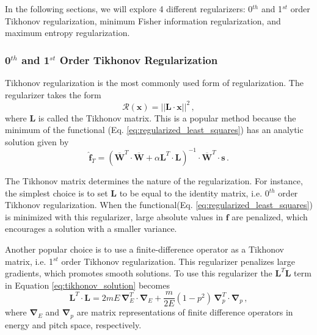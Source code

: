 In the following sections, we will explore 4 different regularizers: 0$^{th}$ and 1$^{st}$ order Tikhonov regularization, minimum Fisher information regularization, and maximum entropy regularization.

\subsubsection{0$^{th}$ and 1$^{st}$ Order Tikhonov Regularization}
Tikhonov regularization is the most commonly used form of regularization. The regularizer takes the form
\begin{equation}
    \mathcal{R}(\mathbf{x}) = ||\mathbf{L}\cdot\mathbf{x}||^2 \,,
\end{equation}
where $\mathbf{L}$ is called the Tikhonov matrix. This is a popular method because the minimum of the functional (Eq. \ref{eq:regularized_least_squares}) has an analytic solution given by
\begin{equation}\label{eq:tikhonov_solution}
    \mathbf{\hat{f}}_T = \left(\mathbf{\overline{W}}^T \cdot \mathbf{\overline{W}} + \alpha \mathbf{L}^T\cdot \mathbf{L} \right)^{-1} \cdot \mathbf{\overline{W}}^T \cdot \mathbf{s} \, . 
\end{equation}

The Tikhonov matrix determines the nature of the regularization. 
For instance, the simplest choice is to set $\mathbf{L}$ to be equal to the identity matrix, i.e. 0$^{th}$ order Tikhonov regularization. When the functional(Eq. \ref{eq:regularized_least_squares}) is minimized with this regularizer, large absolute values in $\mathbf{f}$ are penalized, which encourages a solution with a smaller variance.

Another popular choice is to use a finite-difference operator as a Tikhonov matrix, i.e. 1$^{st}$ order Tikhonov regularization. This regularizer penalizes large gradients, which promotes smooth solutions.
To use this regularizer the $\mathbf{L}^T \mathbf{L}$ term in Equation \ref{eq:tikhonov_solution} becomes
\begin{equation}
    \mathbf{L}^T \cdot \mathbf{L} = 2mE \, \boldsymbol{\nabla}_E^T \cdot \boldsymbol{\nabla}_E + \frac{m}{2E}\left(1-p^2 \right) \, \boldsymbol{\nabla}_p^T \cdot \boldsymbol{\nabla}_p \, ,
\end{equation}
where $\boldsymbol{\nabla}_{E}$ and $\boldsymbol{\nabla}_{p}$ are matrix representations of finite difference operators in energy and pitch space, respectively\cite{jacobsen_stagner2016}.

